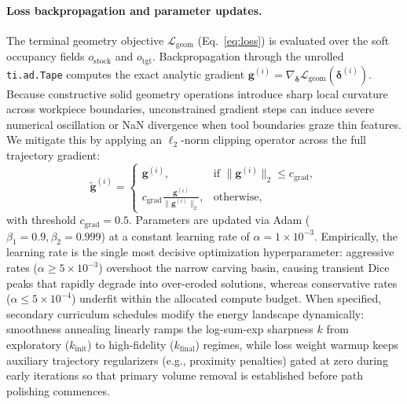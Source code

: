 \paragraph{Loss backpropagation and parameter updates.}
The terminal geometry objective $\mathcal{L}_{\mathrm{geom}}$ (Eq.~\ref{eq:loss}) is evaluated over the soft occupancy fields $o_{\mathrm{stock}}$ and $o_{\mathrm{tgt}}$. Backpropagation through the unrolled \texttt{ti.ad.Tape} computes the exact analytic gradient $\mathbf{g}^{(i)} = \nabla_{\boldsymbol{\delta}} \mathcal{L}_{\mathrm{geom}}(\boldsymbol{\delta}^{(i)})$. Because constructive solid geometry operations introduce sharp local curvature across workpiece boundaries, unconstrained gradient steps can induce severe numerical oscillation or NaN divergence when tool boundaries graze thin features. We mitigate this by applying an $\ell_2$-norm clipping operator across the full trajectory gradient:
\begin{equation}
  \tilde{\mathbf{g}}^{(i)} = \begin{cases}
    \mathbf{g}^{(i)}, & \text{if } \|\mathbf{g}^{(i)}\|_2 \le c_{\mathrm{grad}}, \\
    c_{\mathrm{grad}} \frac{\mathbf{g}^{(i)}}{\|\mathbf{g}^{(i)}\|_2}, & \text{otherwise},
  \end{cases}
\end{equation}
with threshold $c_{\mathrm{grad}} = 0.5$. Parameters are updated via Adam ($\beta_1=0.9, \beta_2=0.999$) at a constant learning rate of $\alpha = 1 \times 10^{-3}$. Empirically, the learning rate is the single most decisive optimization hyperparameter: aggressive rates ($\alpha \ge 5 \times 10^{-3}$) overshoot the narrow carving basin, causing transient Dice peaks that rapidly degrade into over-eroded solutions, whereas conservative rates ($\alpha \le 5 \times 10^{-4}$) underfit within the allocated compute budget. When specified, secondary curriculum schedules modify the energy landscape dynamically: smoothness annealing linearly ramps the log-sum-exp sharpness $k$ from exploratory ($k_{\mathrm{init}}$) to high-fidelity ($k_{\mathrm{final}}$) regimes, while loss weight warmup keeps auxiliary trajectory regularizers (e.g., proximity penalties) gated at zero during early iterations so that primary volume removal is established before path polishing commences.

